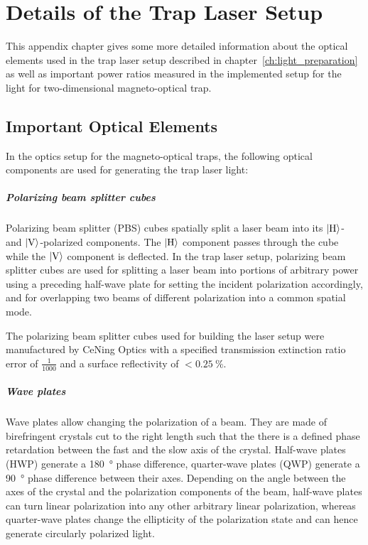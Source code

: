 \renewcommand{\imagepath}{../90-appendix/img}

\appendix

\chapter{Details of the Trap Laser Setup}
This appendix chapter gives some more detailed information about the optical elements used in the trap laser setup described in chapter~\ref{ch:light_preparation} as well as important power ratios measured in the implemented setup for the light for two-dimensional magneto-optical trap.

\section*{Important Optical Elements}\label{ch:optical_components}
In the optics setup for the magneto-optical traps, the following optical components are used for generating the trap laser light:

\paragraph{Polarizing beam splitter cubes} Polarizing beam splitter (PBS) cubes spatially split a laser beam into its $\Ket{\text{H}}$- and $\Ket{\text{V}}$-polarized components. The $\Ket{\text{H}}$ component passes through the cube while the $\Ket{\text{V}}$ component is deflected. In the trap laser setup, polarizing beam splitter cubes are used for splitting a laser beam into portions of arbitrary power using a preceding half-wave plate for setting the incident polarization accordingly, and for overlapping two beams of different polarization into a common spatial mode.

The polarizing beam splitter cubes used for building the laser setup were manufactured by CeNing Optics with a specified transmission extinction ratio error of $\frac{1}{1000}$ and a surface reflectivity of $<\SI{0.25}{\percent}$.
    
\paragraph*{Wave plates} Wave plates allow changing the polarization of a beam. They are made of birefringent crystals cut to the right length such that the there is a defined phase retardation between the fast and the slow axis of the crystal. Half-wave plates (HWP) generate a \SI{180}{\degree} phase difference, quarter-wave plates (QWP) generate a \SI{90}{\degree} phase difference between their axes. Depending on the angle between the axes of the crystal and the polarization components of the beam, half-wave plates can turn linear polarization into any other arbitrary linear polarization, whereas quarter-wave plates change the ellipticity of the polarization state and can hence generate circularly polarized light.

